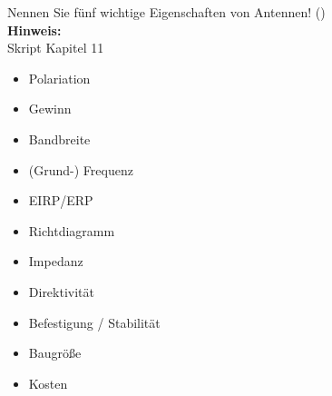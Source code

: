 \begin{question}[section=11,name={Antennen},difficulty=,quantity=1,type=thr,tags={20160310,20131210,20060816}]
	Nennen Sie fünf wichtige Eigenschaften von Antennen! ()
	\\ \textbf{Hinweis:}\\
	Skript Kapitel 11
\end{question}
\begin{solution}
	\begin{itemize}
		\item{Polariation}
		\item{Gewinn}
		\item{Bandbreite}
		\item{(Grund-) Frequenz}
		\item{EIRP/ERP}
		\item{Richtdiagramm}
		\item{Impedanz}
		\item{Direktivität}
		\item{Befestigung / Stabilität}
		\item{Baugröße}
		\item{Kosten}
	\end{itemize}
\end{solution}

